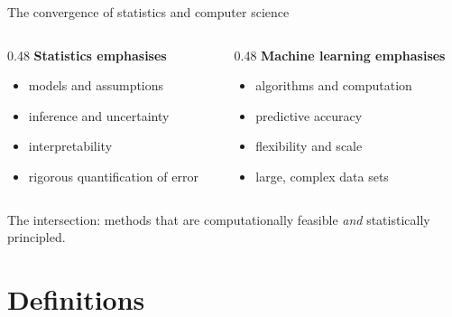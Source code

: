 \documentclass[aspectratio=169,11pt]{beamer}
\begin{document}
\begin{frame}{The convergence of statistics and computer science}
  \begin{columns}[T]
    \begin{column}{0.48\textwidth}
      \textbf{Statistics emphasises}
      \begin{itemize}
        \item models and assumptions
        \item inference and uncertainty
        \item interpretability
        \item rigorous quantification of error
      \end{itemize}
    \end{column}
    \begin{column}{0.48\textwidth}
      \textbf{Machine learning emphasises}
      \begin{itemize}
        \item algorithms and computation
        \item predictive accuracy
        \item flexibility and scale
        \item large, complex data sets
      \end{itemize}
    \end{column}
  \end{columns}
  \begin{takeaway}
    The intersection: methods that are computationally feasible
    \emph{and} statistically principled.
  \end{takeaway}
\end{frame}


\section{Definitions}
\end{document}
